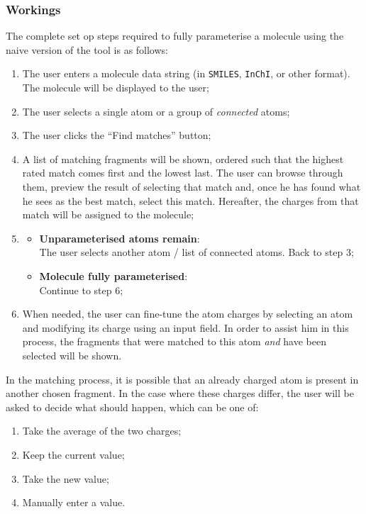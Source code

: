 \subsubsection{Workings}
The complete set op steps required to fully parameterise a molecule using the naive version of the tool is as follows:
\begin{enumerate}[itemsep=.1em, parsep=.2em, topsep=0em]
\item The user enters a molecule data string (in \verb|SMILES|, \verb|InChI|, or other format). The molecule will be displayed to the user;
\item The user selects a single atom or a group of \emph{connected} atoms;
\item The user clicks the ``Find matches'' button;
\item A list of matching fragments will be shown, ordered such that the highest rated match comes first and the lowest last. The user can browse through them, preview the result of selecting that match and, once he has found what he sees as the best match, select this match. Hereafter, the charges from that match will be assigned to the molecule;
\item
\begin{itemize}[leftmargin=0cm, itemsep=.1em, parsep=.1em]
\item[]{\bf Unparameterised atoms remain}:\\The user selects another atom / list of connected atoms. Back to step 3;
\item[] {\bf Molecule fully parameterised}:\\Continue to step 6;
\end{itemize}
\item When needed, the user can fine-tune the atom charges by selecting an atom and modifying its charge using an input field. In order to assist him in this process, the fragments that were matched to this atom \emph{and} have been selected will be shown.
\end{enumerate}

\noindent
In the matching process, it is possible that an already charged atom is present in another chosen fragment. In the case where these charges differ, the user will be asked to decide what should happen, which can be one of:
\begin{enumerate}[itemsep=.1em, parsep=.2em, topsep=0em]
\item Take the average of the two charges;
\item Keep the current value;
\item Take the new value;
\item Manually enter a value.
\end{enumerate}

